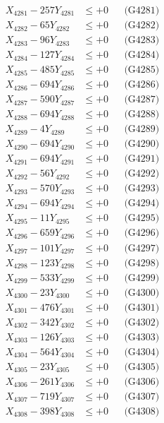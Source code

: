 \documentclass[a4paper,10pt]{article}
\begin{document}
{\begin{align}
\allowbreak
X_{4281} - 257Y_{4281} &\leq +0 && \text{(G4281)} \\
X_{4282} - 65Y_{4282} &\leq +0 && \text{(G4282)} \\
X_{4283} - 96Y_{4283} &\leq +0 && \text{(G4283)} \\
X_{4284} - 127Y_{4284} &\leq +0 && \text{(G4284)} \\
X_{4285} - 485Y_{4285} &\leq +0 && \text{(G4285)} \\
X_{4286} - 694Y_{4286} &\leq +0 && \text{(G4286)} \\
X_{4287} - 590Y_{4287} &\leq +0 && \text{(G4287)} \\
X_{4288} - 694Y_{4288} &\leq +0 && \text{(G4288)} \\
X_{4289} - 4Y_{4289} &\leq +0 && \text{(G4289)} \\
X_{4290} - 694Y_{4290} &\leq +0 && \text{(G4290)} \\
\allowbreak
X_{4291} - 694Y_{4291} &\leq +0 && \text{(G4291)} \\
X_{4292} - 56Y_{4292} &\leq +0 && \text{(G4292)} \\
X_{4293} - 570Y_{4293} &\leq +0 && \text{(G4293)} \\
X_{4294} - 694Y_{4294} &\leq +0 && \text{(G4294)} \\
X_{4295} - 11Y_{4295} &\leq +0 && \text{(G4295)} \\
X_{4296} - 659Y_{4296} &\leq +0 && \text{(G4296)} \\
X_{4297} - 101Y_{4297} &\leq +0 && \text{(G4297)} \\
X_{4298} - 123Y_{4298} &\leq +0 && \text{(G4298)} \\
X_{4299} - 533Y_{4299} &\leq +0 && \text{(G4299)} \\
X_{4300} - 23Y_{4300} &\leq +0 && \text{(G4300)} \\
\allowbreak
X_{4301} - 476Y_{4301} &\leq +0 && \text{(G4301)} \\
X_{4302} - 342Y_{4302} &\leq +0 && \text{(G4302)} \\
X_{4303} - 126Y_{4303} &\leq +0 && \text{(G4303)} \\
X_{4304} - 564Y_{4304} &\leq +0 && \text{(G4304)} \\
X_{4305} - 23Y_{4305} &\leq +0 && \text{(G4305)} \\
X_{4306} - 261Y_{4306} &\leq +0 && \text{(G4306)} \\
X_{4307} - 719Y_{4307} &\leq +0 && \text{(G4307)} \\
X_{4308} - 398Y_{4308} &\leq +0 && \text{(G4308)} \\

\end{align}}
\end{document}
